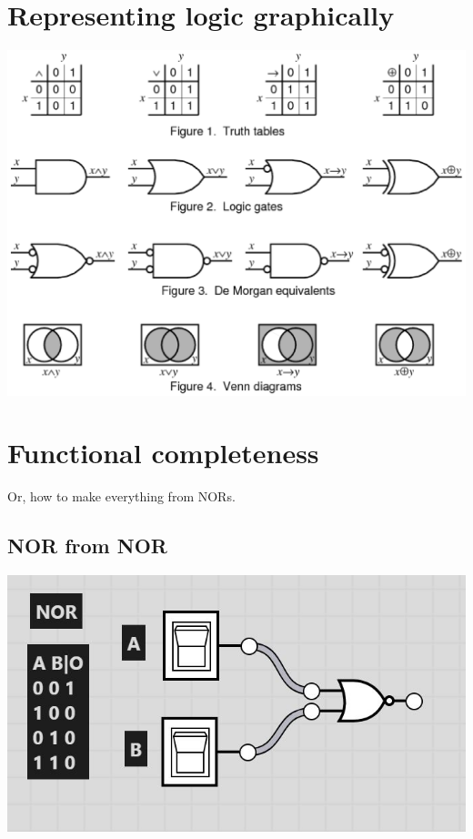 \documentclass[11pt]{book}
\begin{document}
\section{Representing logic graphically}
\begin{center}
	\includegraphics[width = \textwidth]{figures/20.08.png}
\end{center}

\section{Functional completeness}
Or, how to make everything from NORs.
\subsection{NOR from NOR}

\includegraphics[width=\textwidth]{figures/NOR.jpg}
\end{document}
